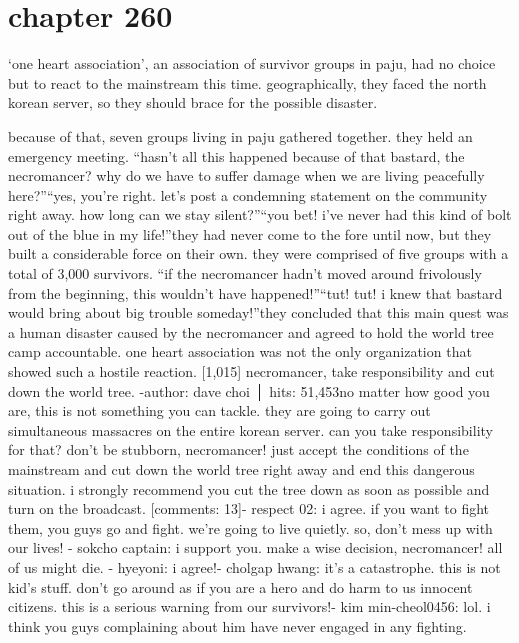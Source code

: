 \section{chapter 260}

                            ‘one heart association’, an association of survivor groups in paju, had no choice but to react to the mainstream this time.
 geographically, they faced the north korean server, so they should brace for the possible disaster.





because of that, seven groups living in paju gathered together.
 they held an emergency meeting.
“hasn’t all this happened because of that bastard, the necromancer? why do we have to suffer damage when we are living peacefully here?”“yes, you’re right.
 let’s post a condemning statement on the community right away.
 how long can we stay silent?”“you bet! i’ve never had this kind of bolt out of the blue in my life!”they had never come to the fore until now, but they built a considerable force on their own.
they were comprised of five groups with a total of 3,000 survivors.
“if the necromancer hadn’t moved around frivolously from the beginning, this wouldn’t have happened!”“tut! tut! i knew that bastard would bring about big trouble someday!”they concluded that this main quest was a human disaster caused by the necromancer and agreed to hold the world tree camp accountable.
one heart association was not the only organization that showed such a hostile reaction.
[1,015] necromancer, take responsibility and cut down the world tree.
-author: dave choi │ hits: 51,453no matter how good you are, this is not something you can tackle.
 they are going to carry out simultaneous massacres on the entire korean server.
 can you take responsibility for that? don’t be stubborn, necromancer! just accept the conditions of the mainstream and cut down the world tree right away and end this dangerous situation.
 i strongly recommend you cut the tree down as soon as possible and turn on the broadcast.
[comments: 13]- respect 02: i agree.
 if you want to fight them, you guys go and fight.
 we’re going to live quietly.
 so, don’t mess up with our lives!
- sokcho captain: i support you.
 make a wise decision, necromancer! all of us might die.
- hyeyoni: i agree!- cholgap hwang: it’s a catastrophe.
 this is not kid’s stuff.
 don’t go around as if you are a hero and do harm to us innocent citizens.
 this is a serious warning from our survivors!- kim min-cheol0456: lol.
 i think you guys complaining about him have never engaged in any fighting.
